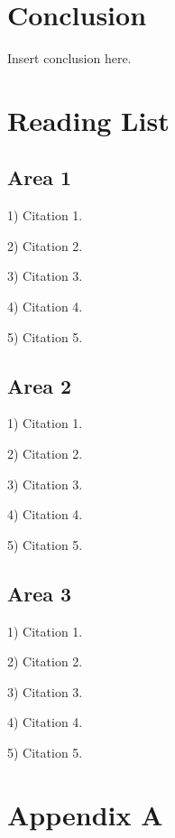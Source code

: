 \documentclass{article}
\begin{document}
\section{Conclusion}

Insert conclusion here.

\newpage

\appendix
\section{Reading List}
\label{app:readinglist}

\subsection{Area 1}

1) Citation 1.

2) Citation 2.

3) Citation 3.

4) Citation 4.

5) Citation 5.


\subsection{Area 2}

1) Citation 1.

2) Citation 2.

3) Citation 3.

4) Citation 4.

5) Citation 5.


\subsection{Area 3}

1) Citation 1.

2) Citation 2.

3) Citation 3.

4) Citation 4.

5) Citation 5.



\newpage

\section{Appendix A}
\label{app:cvtdp2r}


\newpage

 

\end{document}
